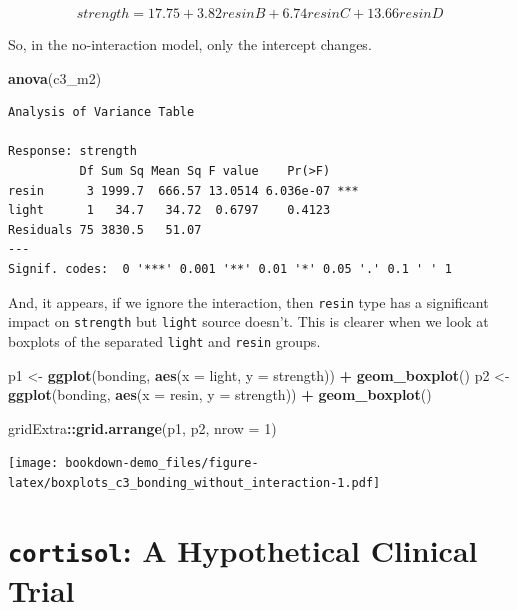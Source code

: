 \documentclass[]{book}
\newenvironment{Shaded}{\begin{snugshade}}{\end{snugshade}}
\newcommand{\KeywordTok}[1]{\textcolor[rgb]{0.13,0.29,0.53}{\textbf{#1}}}
\newcommand{\DataTypeTok}[1]{\textcolor[rgb]{0.13,0.29,0.53}{#1}}
\newcommand{\DecValTok}[1]{\textcolor[rgb]{0.00,0.00,0.81}{#1}}
\newcommand{\StringTok}[1]{\textcolor[rgb]{0.31,0.60,0.02}{#1}}
\newcommand{\OperatorTok}[1]{\textcolor[rgb]{0.81,0.36,0.00}{\textbf{#1}}}
\newcommand{\NormalTok}[1]{#1}
\theoremstyle{definition}
\theoremstyle{definition}
\theoremstyle{definition}
\theoremstyle{remark}
\begin{document}
\[
strength = 17.75 + 3.82 resinB + 6.74 resinC + 13.66 resinD
\]

So, in the no-interaction model, only the intercept changes.

\begin{Shaded}
\begin{Highlighting}[]
\KeywordTok{anova}\NormalTok{(c3_m2)}
\end{Highlighting}
\end{Shaded}

\begin{verbatim}
Analysis of Variance Table

Response: strength
          Df Sum Sq Mean Sq F value    Pr(>F)    
resin      3 1999.7  666.57 13.0514 6.036e-07 ***
light      1   34.7   34.72  0.6797    0.4123    
Residuals 75 3830.5   51.07                      
---
Signif. codes:  0 '***' 0.001 '**' 0.01 '*' 0.05 '.' 0.1 ' ' 1
\end{verbatim}

And, it appears, if we ignore the interaction, then \texttt{resin} type
has a significant impact on \texttt{strength} but \texttt{light} source
doesn't. This is clearer when we look at boxplots of the separated
\texttt{light} and \texttt{resin} groups.

\begin{Shaded}
\begin{Highlighting}[]
\NormalTok{p1 <-}\StringTok{ }\KeywordTok{ggplot}\NormalTok{(bonding, }\KeywordTok{aes}\NormalTok{(}\DataTypeTok{x =}\NormalTok{ light, }\DataTypeTok{y =}\NormalTok{ strength)) }\OperatorTok{+}\StringTok{ }
\StringTok{    }\KeywordTok{geom_boxplot}\NormalTok{()}
\NormalTok{p2 <-}\StringTok{ }\KeywordTok{ggplot}\NormalTok{(bonding, }\KeywordTok{aes}\NormalTok{(}\DataTypeTok{x =}\NormalTok{ resin, }\DataTypeTok{y =}\NormalTok{ strength)) }\OperatorTok{+}
\StringTok{    }\KeywordTok{geom_boxplot}\NormalTok{()}

\NormalTok{gridExtra}\OperatorTok{::}\KeywordTok{grid.arrange}\NormalTok{(p1, p2, }\DataTypeTok{nrow =} \DecValTok{1}\NormalTok{)}
\end{Highlighting}
\end{Shaded}

\texttt{[image: bookdown-demo\_files/figure-latex/boxplots\_c3\_bonding\_without\_interaction-1.pdf]}

\section{\texorpdfstring{\texttt{cortisol}: A Hypothetical Clinical
Trial}{cortisol: A Hypothetical Clinical Trial}}\label{cortisol-a-hypothetical-clinical-trial}
\end{document}

